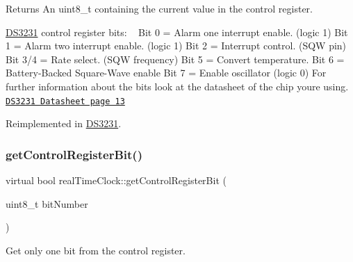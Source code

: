 \begin{DoxyReturn}{Returns}
An uint8\+\_\+t containing the current value in the control register.
\end{DoxyReturn}
\mbox{\hyperlink{class_d_s3231}{D\+S3231}} control register bits\+: ~\newline
Bit 0 = Alarm one interrupt enable. (logic 1) Bit 1 = Alarm two interrupt enable. (logic 1) Bit 2 = Interrupt control. (S\+QW pin) Bit 3/4 = Rate select. (S\+QW frequency) Bit 5 = Convert temperature. Bit 6 = Battery-\/\+Backed Square-\/\+Wave enable Bit 7 = Enable oscillator (logic 0) For further information about the bits look at the datasheet of the chip you\textquotesingle{}re using. \href{https://datasheets.maximintegrated.com/en/ds/DS3231.pdf}{\tt D\+S3231 Datasheet page 13} 

Reimplemented in \mbox{\hyperlink{class_d_s3231_a2e023e091c63208290e275874552a716}{D\+S3231}}.

\mbox{\label{classreal_time_clock_a762441ffb1fbee666cd1642edfb8c929}} 
\subsubsection{\texorpdfstring{get\+Control\+Register\+Bit()}{getControlRegisterBit()}}
{\footnotesize\ttfamily virtual bool real\+Time\+Clock\+::get\+Control\+Register\+Bit (\begin{DoxyParamCaption}\item[{uint8\+\_\+t}]{bit\+Number }\end{DoxyParamCaption})\hspace{0.3cm}{\ttfamily [virtual]}}



Get only one bit from the control register. 


